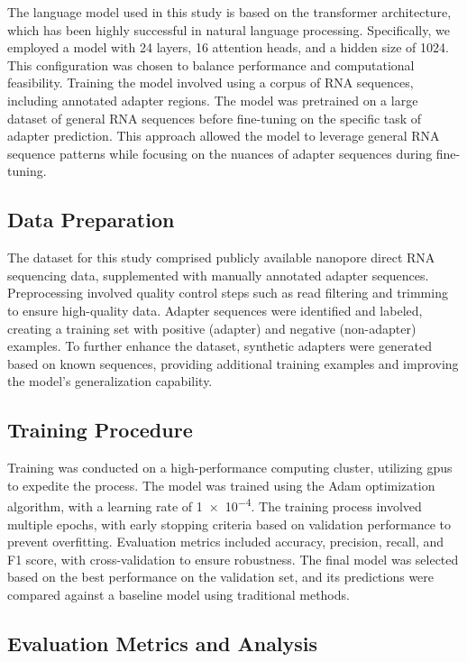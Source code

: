 \documentclass[pdflatex, sn-mathphys-num, lineno]{sn-jnl}%
\theoremstyle{thmstyleone}%
\theoremstyle{thmstyletwo}%
\theoremstyle{thmstylethree}%
\begin{document}
The language model used in this study is based on the transformer architecture, which has been highly successful in natural language processing.
Specifically, we employed a model with \num{24} layers, \num{16} attention heads, and a hidden size of \num{1024}.
This configuration was chosen to balance performance and computational feasibility.
Training the model involved using a corpus of RNA sequences, including annotated adapter regions.
The model was pretrained on a large dataset of general RNA sequences before fine-tuning on the specific task of adapter prediction.
This approach allowed the model to leverage general RNA sequence patterns while focusing on the nuances of adapter sequences during fine-tuning.

\subsection{Data Preparation}

The dataset for this study comprised publicly available nanopore direct RNA sequencing data, supplemented with manually annotated adapter sequences.
Preprocessing involved quality control steps such as read filtering and trimming to ensure high-quality data.
Adapter sequences were identified and labeled, creating a training set with positive (adapter) and negative (non-adapter) examples.
To further enhance the dataset, synthetic adapters were generated based on known sequences, providing additional training examples and improving the model's generalization capability.


\subsection{Training Procedure}

Training was conducted on a high-performance computing cluster, utilizing \glspl{gpu} to expedite the process.
The model was trained using the Adam optimization algorithm, with a learning rate of \num{1e-4}.
The training process involved multiple epochs, with early stopping criteria based on validation performance to prevent overfitting.
Evaluation metrics included accuracy, precision, recall, and F1 score, with cross-validation to ensure robustness.
The final model was selected based on the best performance on the validation set, and its predictions were compared against a baseline model using traditional methods.

\subsection{Evaluation Metrics and Analysis}
\end{document}
